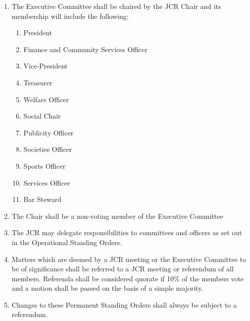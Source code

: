 \begin{enumerate}
\begin{enumerate}
        \end{enumerate}
        \item The Executive Committee shall be chaired by the JCR Chair and its membership will include the following:
        \begin{enumerate}
            \item President
            \item Finance and Community Services Officer
            \item Vice-President
            \item Treasurer
            \item Welfare Officer
            \item Social Chair
            \item Publicity Officer
            \item Societies Officer
            \item Sports Officer
            \item Services Officer
            \item Bar Steward
        \end{enumerate}
        \item The Chair shall be a non-voting member of the Executive Committee
        \item The JCR may delegate responsibilities to committees and officers as set out in the Operational
Standing Orders.
        \item Matters which are deemed by a JCR meeting or the Executive Committee to be of significance shall be referred to a JCR meeting or referendum of all members. Referenda shall be considered quorate if 10\% of the members vote and a motion shall be passed on the basis of a simple majority.
        \item Changes to these Permanent Standing Orders shall always be subject to a referendum.
\end{enumerate}

